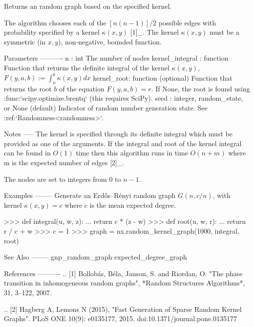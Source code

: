 \begin{DoxyVerb}Returns an random graph based on the specified kernel.

The algorithm chooses each of the $[n(n-1)]/2$ possible edges with
probability specified by a kernel $\kappa(x,y)$ [1]_.  The kernel
$\kappa(x,y)$ must be a symmetric (in $x,y$), non-negative,
bounded function.

Parameters
----------
n : int
    The number of nodes
kernel_integral : function
    Function that returns the definite integral of the kernel $\kappa(x,y)$,
    $F(y,a,b) := \int_a^b \kappa(x,y)dx$
kernel_root: function (optional)
    Function that returns the root $b$ of the equation $F(y,a,b) = r$.
    If None, the root is found using :func:`scipy.optimize.brentq`
    (this requires SciPy).
seed : integer, random_state, or None (default)
    Indicator of random number generation state.
    See :ref:`Randomness<randomness>`.

Notes
-----
The kernel is specified through its definite integral which must be
provided as one of the arguments. If the integral and root of the
kernel integral can be found in $O(1)$ time then this algorithm runs in
time $O(n+m)$ where m is the expected number of edges [2]_.

The nodes are set to integers from $0$ to $n-1$.

Examples
--------
Generate an Erdős–Rényi random graph $G(n,c/n)$, with kernel
$\kappa(x,y)=c$ where $c$ is the mean expected degree.

>>> def integral(u, w, z):
...     return c * (z - w)
>>> def root(u, w, r):
...     return r / c + w
>>> c = 1
>>> graph = nx.random_kernel_graph(1000, integral, root)

See Also
--------
gnp_random_graph
expected_degree_graph

References
----------
.. [1] Bollobás, Béla,  Janson, S. and Riordan, O.
   "The phase transition in inhomogeneous random graphs",
   *Random Structures Algorithms*, 31, 3--122, 2007.

.. [2] Hagberg A, Lemons N (2015),
   "Fast Generation of Sparse Random Kernel Graphs".
   PLoS ONE 10(9): e0135177, 2015. doi:10.1371/journal.pone.0135177
\end{DoxyVerb}
 \mbox{\label{namespacenetworkx_1_1generators_1_1random__graphs_ab8b1774ba3dc8a4363991626409dff1e}} 
